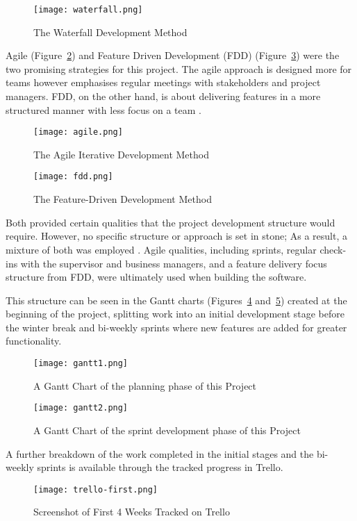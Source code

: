 \begin{figure}[ht!]
    \centerline{\texttt{[image: waterfall.png]}}
    \caption{The Waterfall Development Method}
    \label{fig:water}
\end{figure}

Agile \parencite{shore_art_2022} (Figure~\ref{fig:agile}) and Feature Driven Development (FDD) (Figure~\ref{fig:fdd}) were the two promising strategies for this project. The agile approach is designed more for teams however emphasises regular meetings with stakeholders and project managers. FDD, on the other hand, is about delivering features in a more structured manner with less focus on a team \parencite{lucid_why_2019}.


\begin{figure}[h!]
    \centerline{\texttt{[image: agile.png]}}
    \caption{The Agile Iterative Development Method}
    \label{fig:agile}
\end{figure}

\begin{figure}[h!]
    \centerline{\texttt{[image: fdd.png]}}
    \caption{The Feature-Driven Development Method}
    \label{fig:fdd}
\end{figure}

Both provided certain qualities that the project development structure would require. However, no specific structure or approach is set in stone; As a result, a mixture of both was employed \parencite{sremath_tirumala_hybrid_2016}. Agile qualities, including sprints, regular check-ins with the supervisor and business managers, and a feature delivery focus structure from FDD, were ultimately used when building the software.

This structure can be seen in the Gantt charts (Figures~\ref{fig:gantt1} and~\ref{fig:gantt2}) created at the beginning of the project, splitting work into an initial development stage before the winter break and bi-weekly sprints where new features are added for greater functionality.

\begin{figure}[ht!]
    \centerline{\texttt{[image: gantt1.png]}}
    \caption{A Gantt Chart of the planning phase of this Project}
    \label{fig:gantt1}
\end{figure}

\begin{figure}[ht!]
    \centerline{\texttt{[image: gantt2.png]}}
    \caption{A Gantt Chart of the sprint development phase of this Project}
    \label{fig:gantt2}
\end{figure}

A further breakdown of the work completed in the initial stages and the bi-weekly sprints is available through the tracked progress in Trello.

\begin{figure}[ht!]
    \centerline{\texttt{[image: trello-first.png]}}
    \caption{Screenshot of First 4 Weeks Tracked on Trello}
    \label{fig:trello-board}
\end{figure}